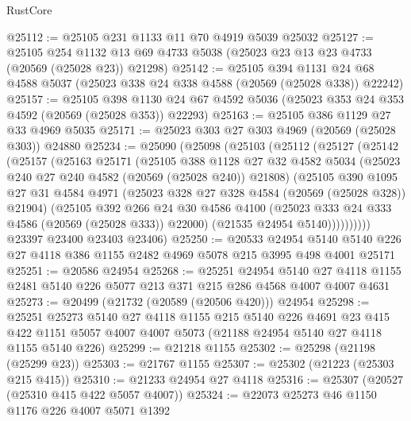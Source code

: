 \begin{lexlean}{RustCore}
\begin{coremodule}
@25112 := @25105 @231 @1133 @11 @70 @4919 @5039 @25032
@25127 := @25105
    @254
    @1132
    @13
    @69
    @4733
    @5038
    (@25023 @23 @13 @23 @4733 (@20569 (@25028 @23)) @21298)
@25142 := @25105
    @394
    @1131
    @24
    @68
    @4588
    @5037
    (@25023 @338 @24 @338 @4588 (@20569 (@25028 @338)) @22242)
@25157 := @25105
    @398
    @1130
    @24
    @67
    @4592
    @5036
    (@25023 @353 @24 @353 @4592 (@20569 (@25028 @353)) @22293)
@25163 := @25105 @386 @1129 @27 @33 @4969 @5035
@25171 := @25023 @303 @27 @303 @4969 (@20569 (@25028 @303)) @24880
@25234 := @25090
    (@25098
      (@25103
        (@25112
          (@25127
            (@25142
              (@25157
                (@25163
                  @25171
                  (@25105
                    @388
                    @1128
                    @27
                    @32
                    @4582
                    @5034
                    (@25023 @240 @27 @240 @4582 (@20569 (@25028 @240)) @21808)
                    (@25105
                      @390
                      @1095
                      @27
                      @31
                      @4584
                      @4971
                      (@25023 @328 @27 @328 @4584 (@20569 (@25028 @328)) @21904)
                      (@25105
                        @392
                        @266
                        @24
                        @30
                        @4586
                        @4100
                        (@25023 @333 @24 @333 @4586 (@20569 (@25028 @333)) @22000)
                        (@21535 @24954 @5140))))))))))
      @23397
      @23400
      @23403
      @23406)
@25250 := @20533
    @24954
    @5140
    @5140
    @226
    @27
    @4118
    @386
    @1155
    @2482
    @4969
    @5078
    @215
    @3995
    @498
    @4001
    @25171
@25251 := @20586 @24954
@25268 := @25251
    @24954
    @5140
    @27
    @4118
    @1155
    @2481
    @5140
    @226
    @5077
    @213
    @371
    @215
    @286
    @4568
    @4007
    @4007
    @4631
@25273 := @20499 (@21732 (@20589 (@20506 @420))) @24954
@25298 := @25251
    @25273
    @5140
    @27
    @4118
    @1155
    @215
    @5140
    @226
    @4691
    @23
    @415
    @422
    @1151
    @5057
    @4007
    @4007
    @5073
    (@21188 @24954 @5140 @27 @4118 @1155 @5140 @226)
@25299 := @21218 @1155
@25302 := @25298 (@21198 (@25299 @23))
@25303 := @21767 @1155
@25307 := @25302 (@21223 (@25303 @215 @415))
@25310 := @21233 @24954 @27 @4118
@25316 := @25307 (@20527 (@25310 @415 @422 @5057 @4007))
@25324 := @22073 @25273 @46 @1150 @1176 @226 @4007 @5071 @1392

\end{coremodule}
\end{lexlean}
